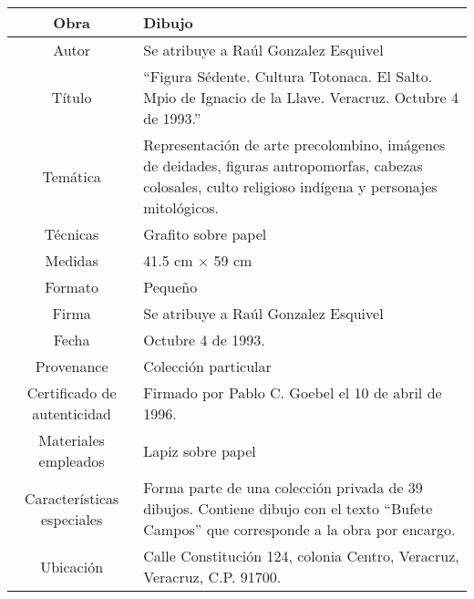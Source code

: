 \documentclass[10pt,letter]{report}
\begin{document}
\begin{table}[H]
\centering
\begin{tabular}{|c|m{}|}
\hline
Obra& Dibujo	\\
\hline
Autor & Se atribuye a Ra\'ul Gonzalez Esquivel\\
\hline
T\'itulo & ``Figura S\'edente. Cultura Totonaca. El Salto. Mpio de Ignacio de la Llave. Veracruz. Octubre 4 de 1993.'' \\
\hline
Tem\'atica & Representaci\'on de arte precolombino, im\'agenes de deidades, figuras antropomorfas, cabezas colosales, culto religioso ind\'igena y personajes mitol\'ogicos.\\
\hline
T\'ecnicas &Grafito sobre papel \\
\hline
Medidas & 41.5 cm $\times$ 59 cm \\
\hline
 Formato & Peque\~no \\
 \hline
 Firma & Se atribuye a Ra\'ul Gonzalez Esquivel\\ 
 \hline
  Fecha & Octubre 4 de 1993. \\
 \hline
 Provenance & Colecci\'on particular\\
 \hline
 Certificado de autenticidad& Firmado por Pablo C. Goebel el 10 de abril de 1996.  \\
 \hline 
  Materiales empleados & Lapiz sobre papel\\
 \hline
 Caracter\'isticas especiales & Forma parte de una colecci\'on privada de 39 dibujos. 
Contiene dibujo con el texto ``Bufete Campos'' que corresponde a la obra por encargo. \\
\hline 
Ubicaci\'on & Calle Constituci\'on 124, colonia Centro, Veracruz, Veracruz, C.P. 91700.\\
\hline

\end{tabular}
\end{table}
\end{document}

